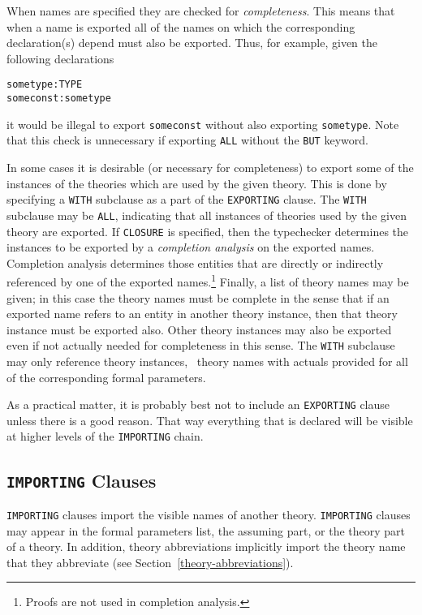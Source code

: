When names are specified they are checked for \emph{completeness}.
This means that when a name is exported all of the names on which the
corresponding declaration(s) depend must also be exported.  Thus, for
example, given the following declarations
\begin{alltt}
  sometype: TYPE
  someconst: sometype
\end{alltt}
it would be illegal to export \texttt{someconst} without also exporting
\texttt{sometype}.  Note that this check is unnecessary if exporting
\texttt{ALL} without the \texttt{BUT} keyword.

In some cases it is desirable (or necessary for completeness) to
export some of the instances of the theories which are used by the
given theory.  This is done by specifying a \texttt{WITH} subclause as a
part of the \texttt{EXPORTING} clause.  The \texttt{WITH} subclause may be
\texttt{ALL}, indicating that all instances of theories used by the given
theory are exported.  If \texttt{CLOSURE} is specified, then the
typechecker determines the instances to be exported by a \emph{
completion analysis} on the exported
names.  Completion analysis determines those entities that are
directly or indirectly referenced by one of the exported
names.\footnote{Proofs are not used in completion analysis.} Finally,
a list of theory names may be given; in this case the theory names
must be complete in the sense that if an exported name refers to an
entity in another theory instance, then that theory instance must be
exported also.  Other theory instances may also be exported even if
not actually needed for completeness in this sense.  The \texttt{WITH}
subclause may only reference theory instances, \ie\ theory names with
actuals provided for all of the corresponding formal parameters.

As a practical matter, it is probably best not to include an
\texttt{EXPORTING} clause unless there is a good reason.  That way
everything that is declared will be visible at higher levels of the
\texttt{IMPORTING} chain.


\subsection{\texttt{IMPORTING} Clauses}

\texttt{IMPORTING} clauses import the visible names of another theory.
\texttt{IMPORTING} clauses may appear in the formal parameters list, the
assuming part, or the theory part of a theory.  In addition, theory
abbreviations implicitly import the theory name that they abbreviate (see
Section~\ref{theory-abbreviations}).

